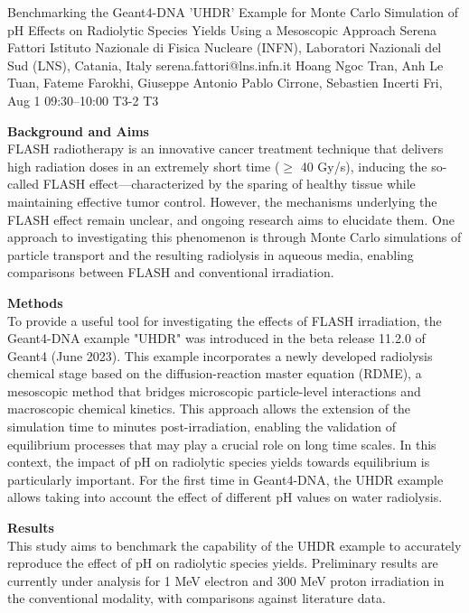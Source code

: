 \begin{talk}
  {Benchmarking the Geant4-DNA 'UHDR' Example for Monte Carlo Simulation of pH Effects on Radiolytic Species Yields Using a Mesoscopic Approach}%
  {Serena Fattori}%
  {Istituto Nazionale di Fisica Nucleare (INFN), Laboratori Nazionali del Sud (LNS), Catania, Italy}%
  {serena.fattori@lns.infn.it}%
  {Hoang Ngoc Tran, Anh Le Tuan, Fateme Farokhi, Giuseppe Antonio Pablo Cirrone, Sebastien Incerti}%
  {}%
  {Fri, Aug 1 09:30--10:00}%
  {T3-2}%
  {T3}%
  
    
   
\textbf{Background and Aims}\\
FLASH radiotherapy is an innovative cancer treatment technique that delivers high radiation doses in an extremely short time ($\geq$ 40 Gy/s), inducing the so-called FLASH effect—characterized by the sparing of healthy tissue while maintaining effective tumor control. However, the mechanisms underlying the FLASH effect remain unclear, and ongoing research aims to elucidate them. One approach to investigating this phenomenon is through Monte Carlo simulations of particle transport and the resulting radiolysis in aqueous media, enabling comparisons between FLASH and conventional irradiation.

\textbf{Methods}\\
To provide a useful tool for investigating the effects of FLASH irradiation, the Geant4-DNA example "UHDR" was introduced in the beta release 11.2.0 of Geant4 (June 2023). This example incorporates a newly developed radiolysis chemical stage based on the diffusion-reaction master equation (RDME), a mesoscopic method that bridges microscopic particle-level interactions and macroscopic chemical kinetics. This approach allows the extension of the simulation time to minutes post-irradiation, enabling the validation of equilibrium processes that may play a crucial role on long time scales. In this context, the impact of pH on radiolytic species yields towards equilibrium is particularly important. For the first time in Geant4-DNA, the UHDR example allows taking into account the effect of different pH values on water radiolysis.

\textbf{Results}\\
This study aims to benchmark the capability of the UHDR example to accurately reproduce the effect of pH on radiolytic species yields. Preliminary results are currently under analysis for 1 MeV electron and 300 MeV proton irradiation in the conventional modality, with comparisons against literature data.


\end{talk}
